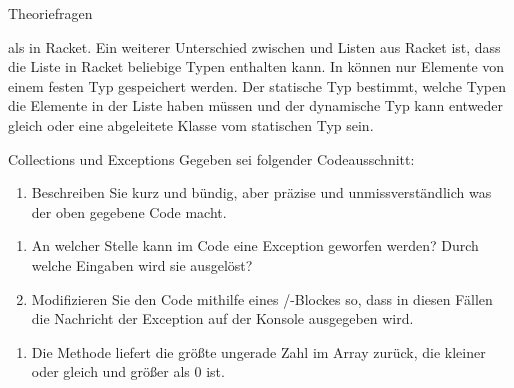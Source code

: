 \documentclass{../tuda-exercise}
\begin{document}
\begin{task}[credit=\stars{0}{3}]{Theoriefragen}
\begin{solution}
\begin{enumerate}
        als in Racket. Ein weiterer Unterschied zwischen  und Listen
        aus Racket ist, dass die Liste in Racket beliebige Typen enthalten kann. In
         können nur Elemente von einem festen Typ gespeichert werden.
        Der statische Typ bestimmt, welche Typen die Elemente in der Liste haben müssen und der
        dynamische Typ kann entweder gleich oder eine abgeleitete Klasse vom statischen Typ sein.
      \end{enumerate}
    \end{solution}
  \end{task}


  \begin{task}[credit=\stars{1}{3}]{Collections und Exceptions}
    Gegeben sei folgender Codeausschnitt:

    

    \begin{enumerate}
      [label=(\arabic*)]
      \item Beschreiben Sie kurz und bündig, aber präzise und unmissverständlich was der oben
      gegebene Code macht.
    \end{enumerate}

    \begin{enumerate}
      [label=(2.\arabic*)]
      \item An welcher Stelle kann im Code eine Exception geworfen werden? Durch welche Eingaben
      wird sie ausgelöst?
      \item Modifizieren Sie den Code mithilfe eines
      /-Blockes so, dass in diesen
      Fällen die Nachricht der Exception auf der Konsole ausgegeben wird.
    \end{enumerate}

    \begin{solution}
      \begin{enumerate}
        [label=(\arabic*)]
        \item Die Methode  liefert die größte ungerade Zahl im Array zurück, die
        kleiner oder gleich  und größer als \(0\) ist.
      \end{enumerate}


\end{solution}
\end{task}
\end{document}
